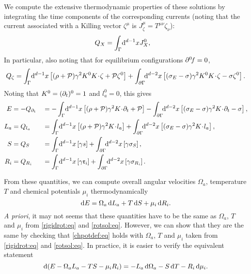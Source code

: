 \documentclass[12pt]{article}
\newcommand{\ploc}{\mathcal{P}}
\newcommand{\rl}{\mathfrak{r}}
\newcommand{\mg}{\mu}
\newcommand{\vint}{\int_\Gamma\!\dr^{d-1}x}
\newcommand{\aint}{\int_{\p\Gamma}\!\!\dr^{d-2}x}
\begin{document}
We compute the extensive thermodynamic properties of these solutions by integrating the time components of the corresponding currents (noting that the current associated with a Killing vector $\zeta^\mu$ is $J^\mu_\zeta = T^{\mu\nu}\zeta_\nu$):
%
\begin{equation}\label{noetherch:eq}
 \begin{split}
  Q_X &= \vint J^0_X,
 \end{split}
\end{equation}
%
In particular, also noting that for equilibrium configurations $\partial^0\!f=0$,
%
\begin{equation}\label{killingcharge:eq}
  Q_\zeta = \vint\brk{(\rho+\ploc)\gamma^2 K^0 K\cdt\zeta
   + \ploc \zeta^0 } + \aint \brk{(\sigma_E-\sigma)\gamma^2 K^0 K\cdt\zeta - \sigma \zeta^0}.
\end{equation}
%
Noting that $K^0=(\partial_t)^0=1$ and $l_a^0=0$, this gives
%
\begin{equation}\label{thermcharge:eq}
  \begin{aligned}
    E &= -Q_{\p_t}& &= -\vint\brk{(\rho+\ploc)\gamma^2 K\cdt\p_t +\ploc}
       -\aint \brk{(\sigma_E-\sigma)\gamma^2 K\cdt\p_t -\sigma}, \\
    L_a &= Q_{l_a}& &= \vint\brk{(\rho+\ploc)\gamma^2 K\cdt l_a}
        +\aint \brk{(\sigma_E-\sigma)\gamma^2 K\cdt l_a},\\
    S &= Q_S& &= \vint\brk{\gamma s}+\aint\brk{\gamma \sigma_S},\\
    R_i &= Q_{R_i}& &= \vint\brk{\gamma \rl_i}+\aint\brk{\gamma \sigma_{R_i}}.\\
  \end{aligned}
\end{equation}
%

From these quantities, we can compute overall angular velocities $\Omega_a$, temperature $T$ and chemical potentials $\mg_i$ thermodynamically
%
\begin{equation}\label{chpotdef:eq}
  \dr E = \Omega_a \,\dr L_a + T \,\dr S + \mg_i \,\dr R_i.
\end{equation}
%
\emph{A priori}, it may not seems that these quantities have to be the same as $\Omega_a$, $T$ and $\mg_i$ from \eqref{rigidrot:eq} and \eqref{rotsol:eq}. However, we can show that they are the same by checking that \eqref{chpotdef:eq} holds with $\Omega_a$, $T$ and $\mg_i$ taken from \eqref{rigidrot:eq} and \eqref{rotsol:eq}. In practice, it is easier to verify the equivalent statement
%
\begin{equation}\label{chpotcheck:eq}
  \dr(E -\Omega_a L_a - T S - \mg_i R_i) = - L_a \,\dr \Omega_a - S \,\dr T - R_i \,\dr \mg_i.
\end{equation}
%
\end{document}
